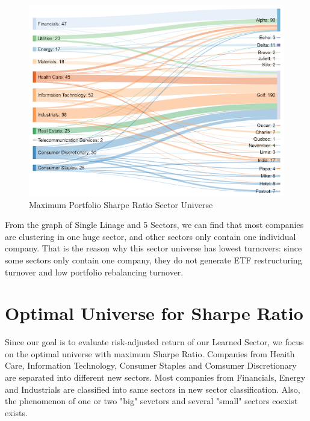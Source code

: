 \documentclass[../main.tex]{subfiles}
\begin{document}
\begin{figure}[H]
    \centering
    \includegraphics[scale=0.55]{images/complete_2017_17.png}
    \caption{Maximum Portfolio Sharpe Ratio Sector Universe}
    \label{fig:optimal_sector_universes:max_sharpe}
\end{figure}

From the graph of Single Linage and  5 Sectors, we can find that most companies are clustering in one huge sector, and other sectors only contain one individual company. That is the reason why this sector universe has lowest turnovers: since some sectors only contain one company, they do not generate ETF restructuring turnover and low portfolio rebalancing turnover. 

\section{Optimal Universe for Sharpe Ratio}
Since our goal is to evaluate risk-adjusted return of our Learned Sector, we focus on the optimal universe with maximum Sharpe Ratio. Companies from Heaith Care, Information Technology, Consumer Staples and Comsumer Discretionary are separated into different new sectors. Most companies from Financials, Energy and Industrials are classified into same sectors in new sector classification. Also, the phenomenon of one or two "big" sevctors and several "small" sectors coexist exists. 
\end{document}
